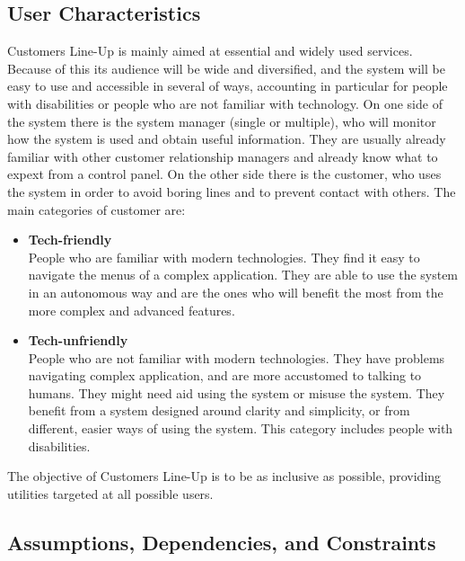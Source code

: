 \subsection{User Characteristics}
Customers Line-Up is mainly aimed at essential and widely used services.
Because of this its audience will be wide and diversified, and the system will be easy to use and accessible in several of ways, accounting in particular for people with disabilities or people who are not familiar with technology.
On one side of the system there is the system manager (single or multiple), who will monitor how the system is used and obtain useful information.
They are usually already familiar with other customer relationship managers and already know what to expext from a control panel.
On the other side there is the customer, who uses the system in order to avoid boring lines and to prevent contact with others.
The main categories of customer are:
\begin{itemize}
    \item \textbf{Tech-friendly}\\
        People who are familiar with modern technologies. They find it easy to navigate the menus of a complex application.
        They are able to use the system in an autonomous way and are the ones who will benefit the most from the more complex and advanced features.
    \item \textbf{Tech-unfriendly}\\
        People who are not familiar with modern technologies. They have problems navigating complex application, and are more accustomed to talking to humans.
        They might need aid using the system or misuse the system. They benefit from a system designed around clarity and simplicity, or from different, easier ways of using the system.
        This category includes people with disabilities.
\end{itemize}

The objective of Customers Line-Up is to be as inclusive as possible, providing utilities targeted at all possible users.

\subsection{Assumptions, Dependencies, and Constraints}

